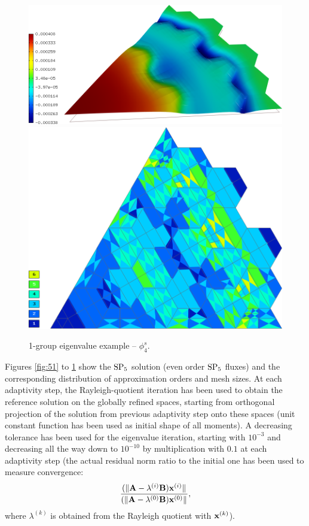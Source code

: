 \begin{figure}[!ht]
\centering
  \includegraphics[scale=.25]{hex/f4.png}
	\hspace{.5em}
  \includegraphics[scale=.19]{hex/mesh_f4.png}
	\caption[Solution of the 1-group eigenvalue example]{1-group eigenvalue example -- $\phi_4^s$.}
	\label{fig:53}
\end{figure}

Figures \ref{fig:51} to \ref{fig:53} show
the $\SPN[5]$ solution (even order $\SPN[5]$ fluxes) and the corresponding distribution of approximation orders and mesh
sizes. At each adaptivity step, the Rayleigh-quotient iteration has been used to obtain the reference solution on the
globally refined spaces, starting from orthogonal projection of the solution from previous 
adaptivity step onto these spaces (unit constant function has been used as initial shape of all moments). A decreasing
tolerance has been used for the eigenvalue iteration, starting with $10^{-3}$ and decreasing all the way down to
$10^{-10}$ by multiplication with $0.1$ at each adaptivity step (the actual residual norm ratio to the initial one has
been used to measure convergence:
$$\frac{(\norm{\mat{A} - \lambda^{(i)}\mat{B})\mat{x}^{(i)}}}{(\norm{\mat{A} - \lambda^{(0)}\mat{B})\mat{x}^{(0)}}},
$$
where $\lambda^{(k)}$ is obtained from the Rayleigh quotient with $\mat{x}^{(k)}$).

